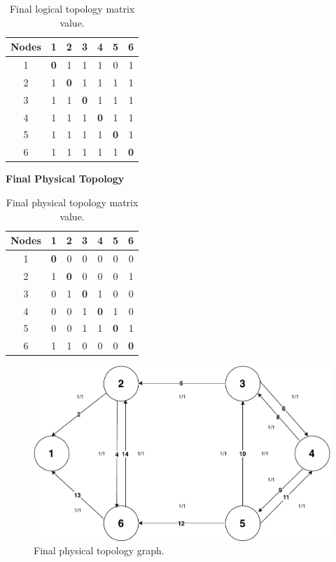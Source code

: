 \begin{table}[H]
	\centering	
	\begin{tabular}{|c|c|c|c|c|c|c|}
		\hline
		\multicolumn{1}{|l|}{\textbf{Nodes}} & 1   & 2   & 3   & 4   & 5   & 6  \\ \hline
		1                           & \textbf{0}   & 1 & 1 & 1 & 0 & 1 \\ \hline
		2                           & 1 & \textbf{0}   & 1 & 1 & 1 & 1 \\ \hline
		3                           & 1 & 1 & \textbf{0}   & 1 & 1 & 1 \\ \hline
		4                           & 1 & 1 & 1 & \textbf{0}   & 1 & 1 \\ \hline
		5                           & 1 & 1 & 1 & 1 & \textbf{0}   & 1 \\ \hline
		6                           & 1 & 1 & 1 & 1 & 1 & \textbf{0}   \\ \hline
	\end{tabular}
	\caption{Final logical topology matrix value.}
	\label{Transparentlogical_topology_updated}
\end{table}

\textbf{Final Physical Topology}

\begin{table}[H]
	\centering
	\begin{tabular}{|c|c|c|c|c|c|c|}
		\hline
		\textbf{Nodes} & 1 & 2 & 3 & 4 & 5 & 6 \\ \hline
		1     & \textbf{0} & 0 & 0 & 0 & 0 & 0 \\ \hline
		2     & 1 & \textbf{0} & 0 & 0 & 0 & 1 \\ \hline
		3     & 0 & 1 & \textbf{0} & 1 & 0 & 0 \\ \hline
		4     & 0 & 0 & 1 & \textbf{0} & 1 & 0 \\ \hline
		5     & 0 & 0 & 1 & 1 & \textbf{0} & 1 \\ \hline
		6     & 1 & 1 & 0 & 0 & 0 & \textbf{0} \\ \hline
	\end{tabular}
	\caption{Final physical topology matrix value.}
\end{table}
\begin{figure}[H]
	\centering
	\includegraphics[width=12cm]{sdf/heuristic/transparent/figures/finalPhysicalTopology}
	\caption{Final physical topology graph.}
\end{figure}

